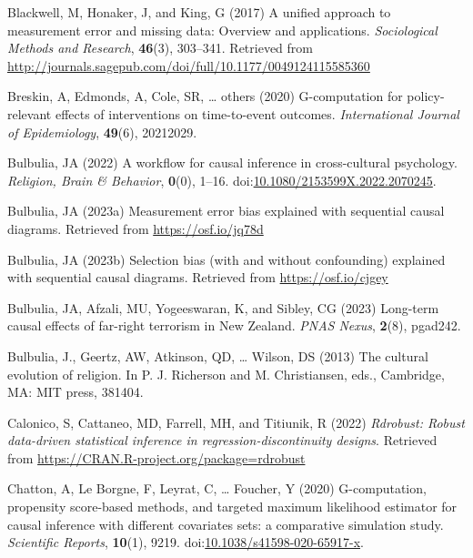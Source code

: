 \documentclass[
  singlecolumn]{article}
\newlength{\cslhangindent}
\newenvironment{CSLReferences}[2] %
 {\begin{list}{}{%
  \setlength{\itemindent}{0pt}
  \setlength{\leftmargin}{0pt}
  \setlength{\parsep}{0pt}
  \ifodd #1
   \setlength{\leftmargin}{\cslhangindent}
   \setlength{\itemindent}{-1\cslhangindent}
  \fi
  \setlength{\itemsep}{#2\baselineskip}}}
 {\end{list}}
\begin{document}
\begin{CSLReferences}{1}{0}
Blackwell, M, Honaker, J, and King, G (2017) A unified approach to
measurement error and missing data: Overview and applications.
\emph{Sociological Methods and Research}, \textbf{46}(3), 303--341.
Retrieved from
\url{http://journals.sagepub.com/doi/full/10.1177/0049124115585360}

Breskin, A, Edmonds, A, Cole, SR, \ldots{} others (2020) G-computation
for policy-relevant effects of interventions on time-to-event outcomes.
\emph{International Journal of Epidemiology}, \textbf{49}(6), 20212029.

Bulbulia, JA (2022) A workflow for causal inference in cross-cultural
psychology. \emph{Religion, Brain \& Behavior}, \textbf{0}(0), 1--16.
doi:\href{https://doi.org/10.1080/2153599X.2022.2070245}{10.1080/2153599X.2022.2070245}.

Bulbulia, JA (2023a) Measurement error bias explained with sequential
causal diagrams. Retrieved from \url{https://osf.io/jq78d}

Bulbulia, JA (2023b) Selection bias (with and without confounding)
explained with sequential causal diagrams. Retrieved from
\url{https://osf.io/cjgey}

Bulbulia, JA, Afzali, MU, Yogeeswaran, K, and Sibley, CG (2023)
Long-term causal effects of far-right terrorism in {N}ew {Z}ealand.
\emph{PNAS Nexus}, \textbf{2}(8), pgad242.

Bulbulia, J., Geertz, AW, Atkinson, QD, \ldots{} Wilson, DS (2013) The
cultural evolution of religion. In P. J. Richerson and M. Christiansen,
eds., Cambridge, MA: MIT press, 381404.

Calonico, S, Cattaneo, MD, Farrell, MH, and Titiunik, R (2022)
\emph{Rdrobust: Robust data-driven statistical inference in
regression-discontinuity designs}. Retrieved from
\url{https://CRAN.R-project.org/package=rdrobust}

Chatton, A, Le Borgne, F, Leyrat, C, \ldots{} Foucher, Y (2020)
G-computation, propensity score-based methods, and targeted maximum
likelihood estimator for causal inference with different covariates
sets: a comparative simulation study. \emph{Scientific Reports},
\textbf{10}(1), 9219.
doi:\href{https://doi.org/10.1038/s41598-020-65917-x}{10.1038/s41598-020-65917-x}.


\end{CSLReferences}
\end{document}
